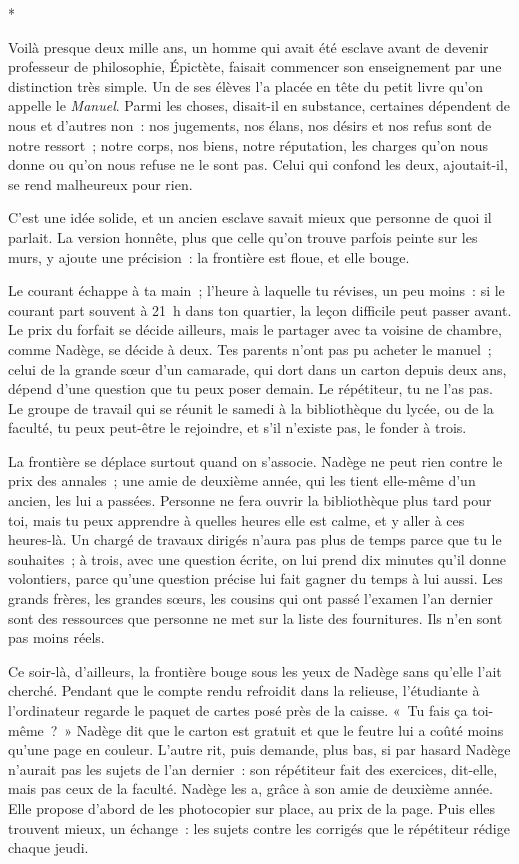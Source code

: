 \documentclass[10.5pt,twoside,openright]{book}
\newcommand{\asterisme}{\par\vspace{0.7em}\centerline{\color{gris}*\quad*\quad*}\vspace{0.7em}\par\noindent}
\begin{document}
\asterisme

Voilà presque deux mille ans, un homme qui avait été esclave avant de devenir professeur de philosophie, Épictète, faisait commencer son enseignement par une distinction très simple. Un de ses élèves l’a placée en tête du petit livre qu’on appelle le \emph{Manuel}. Parmi les choses, disait-il en substance, certaines dépendent de nous et d’autres non : nos jugements, nos élans, nos désirs et nos refus sont de notre ressort ; notre corps, nos biens, notre réputation, les charges qu’on nous donne ou qu’on nous refuse ne le sont pas. Celui qui confond les deux, ajoutait-il, se rend malheureux pour rien.

C’est une idée solide, et un ancien esclave savait mieux que personne de quoi il parlait. La version honnête, plus que celle qu’on trouve parfois peinte sur les murs, y ajoute une précision : la frontière est floue, et elle bouge.

Le courant échappe à ta main ; l’heure à laquelle tu révises, un peu moins : si le courant part souvent à 21 h dans ton quartier, la leçon difficile peut passer avant. Le prix du forfait se décide ailleurs, mais le partager avec ta voisine de chambre, comme Nadège, se décide à deux. Tes parents n’ont pas pu acheter le manuel ; celui de la grande sœur d’un camarade, qui dort dans un carton depuis deux ans, dépend d’une question que tu peux poser demain. Le répétiteur, tu ne l’as pas. Le groupe de travail qui se réunit le samedi à la bibliothèque du lycée, ou de la faculté, tu peux peut-être le rejoindre, et s’il n’existe pas, le fonder à trois.

La frontière se déplace surtout quand on s’associe. Nadège ne peut rien contre le prix des annales ; une amie de deuxième année, qui les tient elle-même d’un ancien, les lui a passées. Personne ne fera ouvrir la bibliothèque plus tard pour toi, mais tu peux apprendre à quelles heures elle est calme, et y aller à ces heures-là. Un chargé de travaux dirigés n’aura pas plus de temps parce que tu le souhaites ; à trois, avec une question écrite, on lui prend dix minutes qu’il donne volontiers, parce qu’une question précise lui fait gagner du temps à lui aussi. Les grands frères, les grandes sœurs, les cousins qui ont passé l’examen l’an dernier sont des ressources que personne ne met sur la liste des fournitures. Ils n’en sont pas moins réels.

Ce soir-là, d’ailleurs, la frontière bouge sous les yeux de Nadège sans qu’elle l’ait cherché. Pendant que le compte rendu refroidit dans la relieuse, l’étudiante à l’ordinateur regarde le paquet de cartes posé près de la caisse. « Tu fais ça toi-même ? » Nadège dit que le carton est gratuit et que le feutre lui a coûté moins qu’une page en couleur. L’autre rit, puis demande, plus bas, si par hasard Nadège n’aurait pas les sujets de l’an dernier : son répétiteur fait des exercices, dit-elle, mais pas ceux de la faculté. Nadège les a, grâce à son amie de deuxième année. Elle propose d’abord de les photocopier sur place, au prix de la page. Puis elles trouvent mieux, un échange : les sujets contre les corrigés que le répétiteur rédige chaque jeudi.
\end{document}
